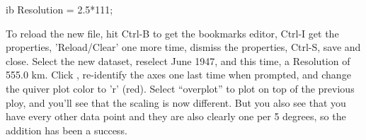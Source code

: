 \begin{vcode}{ib}
Resolution = 2.5*111; 
\end{vcode}

To reload the new file, hit Ctrl-B to get the bookmarks editor, Ctrl-I
get the properties, 'Reload/Clear' one more time, dismiss the
properties, Ctrl-S, save and close.
Select the new dataset, reselect 
June 1947, and this time, a Resolution of 555.0 km.  Click
, re-identify the axes one last time when prompted,
and change the quiver plot color to 'r' (red).  Select ``overplot'' to
plot on top of the previous ploy, and you'll see that the scaling is
now different.  But you also see that you have every other data point
and they are also clearly one per 5 degrees, so the addition has been
a success.

%
%
%
%
%
%




